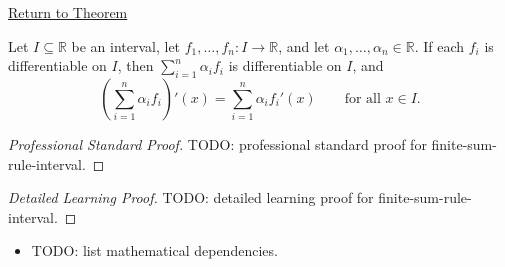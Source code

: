 \newpage
{}
\label{prf:finite-sum-rule-interval}

\begin{remark*}[Return]
\hyperref[cor:finite-sum-rule-interval]{Return to Theorem}
\end{remark*}

\begin{theorem*}
Let $I \subseteq \mathbb{R}$ be an interval, let $f_1, \dots, f_n : I \to \mathbb{R}$, and let $\alpha_1, \dots, \alpha_n \in \mathbb{R}$. If each $f_i$ is differentiable on $I$, then $\sum_{i=1}^{n} \alpha_i f_i$ is differentiable on $I$, and
\[
\left(\sum_{i=1}^{n} \alpha_i f_i\right)'(x) = \sum_{i=1}^{n} \alpha_i f_i'(x) \qquad \text{for all } x \in I.
\]
\end{theorem*}

\begin{proof}[Professional Standard Proof]
\LRAProofBodyStart
TODO: professional standard proof for finite-sum-rule-interval.
\end{proof}

\begin{proof}[Detailed Learning Proof]
\LRAProofBodyStart
TODO: detailed learning proof for finite-sum-rule-interval.
\end{proof}

\begin{remark*}
\end{remark*}

\begin{dependencies}
\begin{itemize}
  \item TODO: list mathematical dependencies.
\end{itemize}
\end{dependencies}

\clearpage
